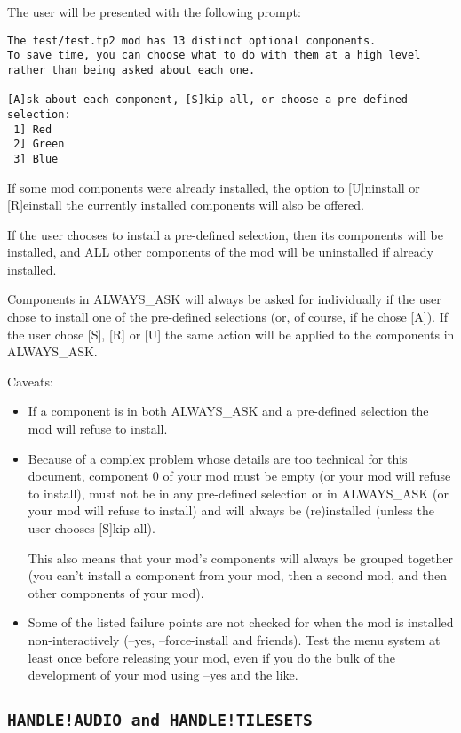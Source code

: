 \documentclass{article}
\def\DEFINE#1{{\tt \bf #1}\label{#1}\index{#1}}
\begin{document}
The user will be presented with the following prompt:

\begin{verbatim}
The test/test.tp2 mod has 13 distinct optional components.
To save time, you can choose what to do with them at a high level rather than being asked about each one.

[A]sk about each component, [S]kip all, or choose a pre-defined selection:
 1] Red
 2] Green
 3] Blue
\end{verbatim}

If some mod components were already installed, the option to [U]ninstall
or [R]einstall the currently installed components will also be offered.

If the user chooses to install a pre-defined selection, then its components
will be installed, and ALL other components of the mod will be uninstalled
if already installed.

Components in ALWAYS_ASK will always be asked for individually if the user
chose to install one of the pre-defined selections (or, of course, if he chose
[A]). If the user chose [S], [R] or [U] the same action will be applied to the
components in ALWAYS_ASK.

Caveats:
\begin{itemize}
\item If a component is in both ALWAYS_ASK and a pre-defined selection the mod
will refuse to install.
\item Because of a complex problem whose details are too technical for this
document, component 0 of your mod must be empty (or your mod will refuse to
install), must not be in any pre-defined selection or in ALWAYS_ASK (or your
mod will refuse to install) and will always be (re)installed (unless the user
chooses [S]kip all).

This also means that your mod's components will always be grouped together (you
can't install a component from your mod, then a second mod, and then other
components of your mod).
\item Some of the listed failure points are not checked for when the mod is
installed non-interactively (--yes, --force-install and friends). Test the menu
system at least once before releasing your mod, even if you do the bulk of the
development of your mod using --yes and the like.
\end{itemize}

\subsection{\DEFINE{HANDLE!AUDIO and HANDLE!TILESETS}}
\end{document}
